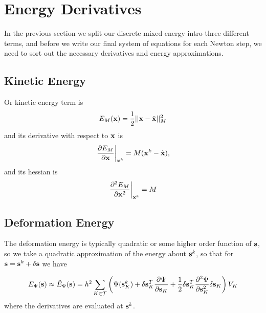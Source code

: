 
\section{Energy Derivatives}

In the previous section we split our discrete mixed energy intro three different terms, and before we write our final system of equations for each Newton step, we need to sort out the necessary derivatives and energy approximations.

\subsection{Kinetic Energy}
Or kinetic energy term is
\begin{align}
E_M (\mathbf{x}) &= \frac{1}{2} ||\mathbf{x} - \tilde{\mathbf{x}}||_M^2 \\
\end{align}
and its derivative with respect to $\mathbf{x}$ is
\begin{equation}
\begin{split}
\left. \frac{\partial E_M }{\partial \mathbf{x}} \right|_{\mathbf{x}^k} &= M(\mathbf{x}^k - \tilde{\mathbf{x}}) \\
\end{split},
\end{equation}
and its hessian is
\begin{equation}
\begin{split}
\left. \frac{\partial^2 E_M }{\partial \mathbf{x}^2} \right|_{\mathbf{x}^k} &= M \\
\end{split}
\end{equation}

\subsection{Deformation Energy}
The deformation energy is typically quadratic or some higher order function of $\mathbf{s}$, so we take a quadratic approximation of the energy about $\mathbf{s}^k$, so that for $\mathbf{s}=\mathbf{s}^k + \delta \mathbf{s}$ we have

\begin{equation}
E_\Psi (\mathbf{s}) \approx \tilde{E}_\Psi (\mathbf{s}) = h^2 \sum_{K \in \mathcal{T}} \left(\Psi(\mathbf{s}_K^k) +
 \delta \mathbf{s}_K^T \frac{\partial \Psi}{\partial \mathbf{s}_K}
 + \frac{1}{2}\delta \mathbf{s}_K^T \frac{\partial^2 \Psi}{\partial \mathbf{s}_K^2} \delta \mathbf{s}_K \right) V_K
\end{equation}
where the derivatives are evaluated at $\mathbf{s}^k$.

